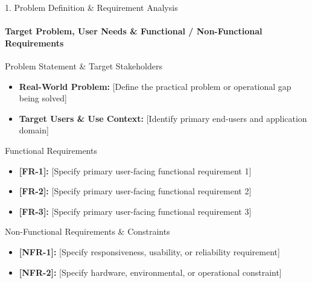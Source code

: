 \documentclass[aspectratio=169, 11pt]{beamer}
\begin{document}
\begin{frame}{1. Problem Definition \& Requirement Analysis}
    \framesubtitle{Target Problem, User Needs \& Functional / Non-Functional Requirements}
    \begin{block}{Problem Statement \& Target Stakeholders}
        \begin{itemize}
            \item \textbf{Real-World Problem:} {[Define the practical problem or operational gap being solved]}
            \item \textbf{Target Users \& Use Context:} {[Identify primary end-users and application domain]}
        \end{itemize}
    \end{block}

    \begin{block}{Functional Requirements}
        \begin{itemize}
            \item \textbf{[FR-1]:} {[Specify primary user-facing functional requirement 1]}
            \item \textbf{[FR-2]:} {[Specify primary user-facing functional requirement 2]}
            \item \textbf{[FR-3]:} {[Specify primary user-facing functional requirement 3]}
        \end{itemize}
    \end{block}

    \begin{block}{Non-Functional Requirements \& Constraints}
        \begin{itemize}
            \item \textbf{[NFR-1]:} {[Specify responsiveness, usability, or reliability requirement]}
            \item \textbf{[NFR-2]:} {[Specify hardware, environmental, or operational constraint]}
        \end{itemize}
    \end{block}
\end{frame}
\end{document}
